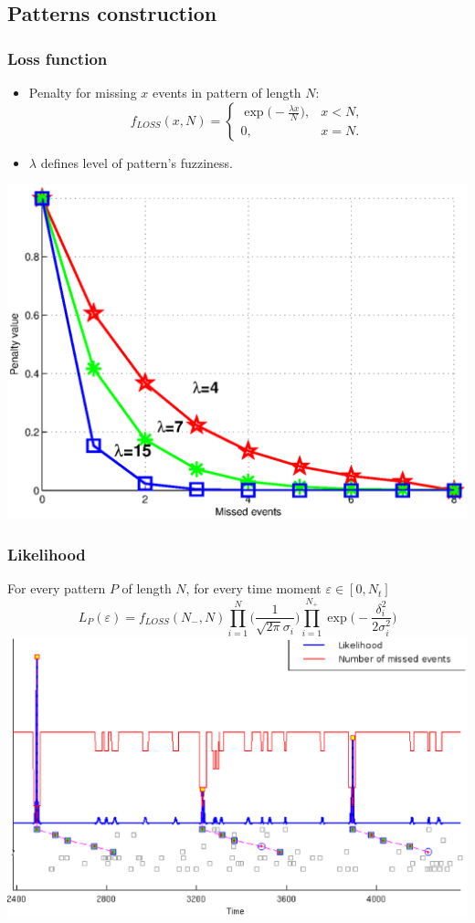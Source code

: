 \documentclass[smaller]{beamer}
\begin{document}
\subsection{ Patterns construction }

\begin{frame}
  \frametitle{Loss function }
  \begin{itemize}
  \item Penalty for missing $x$ events in pattern of length $N$:
  $$
  f_{LOSS}(x,N)= \begin{cases}
   \exp\bigl(-\frac{\lambda x}{N}\bigr), & x < N, \\
   0,                                    & x=N.
   \end{cases}
  $$
  \item $\lambda$ defines level of pattern's fuzziness.
   \end{itemize}
   \includegraphics[scale=0.35]{MB_LF.eps}
\end{frame}

\begin{frame}
  \frametitle{Likelihood }
  For every pattern $P$ of length $N$, for every time moment $\varepsilon\in[0,N_t]$ 
  $$
  L_P(\varepsilon)=f_{LOSS}(N_-,N)\prod_{i=1}^{N}\biggl( \frac1{\sqrt{2\pi}\sigma_i }\biggr)  
  \prod_{i=1}^{N_+}\exp\biggl(- \frac{\delta_i^2}{2\sigma_i^2}\biggr)
  $$
  \includegraphics[scale=0.4]{norm_12_of_14.eps}
\end{frame}
\end{document}
